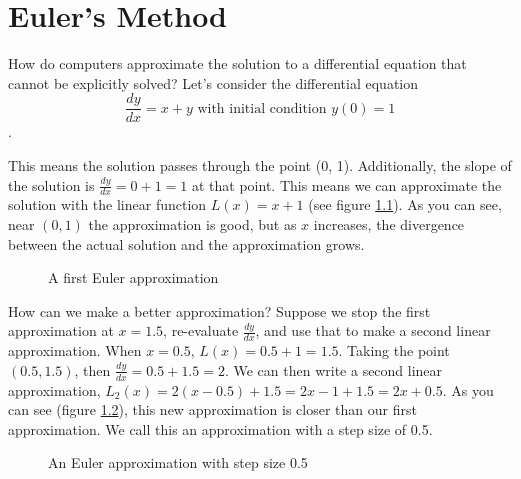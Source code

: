 \chapter{Euler's Method}
How do computers approximate the solution to a differential equation that 
cannot be explicitly solved? Let's consider the differential equation 
$$\frac{dy}{dx} = x + y \text{ with initial condition } y(0) = 1$$.

This means the solution passes through the point (0, 1). Additionally, the 
slope of the solution is $\frac{dy}{dx} = 0 + 1 = 1$ at that point. This means 
we can approximate the solution with the linear function $L(x) = x + 1$ (see 
figure \ref{fig:euler1}). As you can see, near $(0,1)$ the approximation is 
good, but as $x$ increases, the divergence between the actual solution and the 
approximation grows. 

\begin{figure}[htbp]
\centering
{}
\caption{A first Euler approximation}
\label{fig:euler1}
\end{figure}

How can we make a better approximation? Suppose we stop the first 
approximation at $x = 1.5$, re-evaluate $\frac{dy}{dx}$, and use that to make 
a second linear approximation. When $x = 0.5$, $L(x) = 0.5 + 1 = 1.5$. Taking 
the point $(0.5, 1.5)$, then $\frac{dy}{dx} = 0.5 + 1.5 = 2$. We can then 
write a second linear approximation, $L_2(x) = 2(x - 0.5) + 1.5 = 2x - 1 + 1.5 
= 2x + 0.5$. As you can see (figure \ref{fig:euler2}), this new approximation 
is closer than our first approximation. We call this an approximation with a 
step size of 0.5.

\begin{figure}[htbp]
\centering
{}
\caption{An Euler approximation with step size 0.5}
\label{fig:euler2}
\end{figure}

